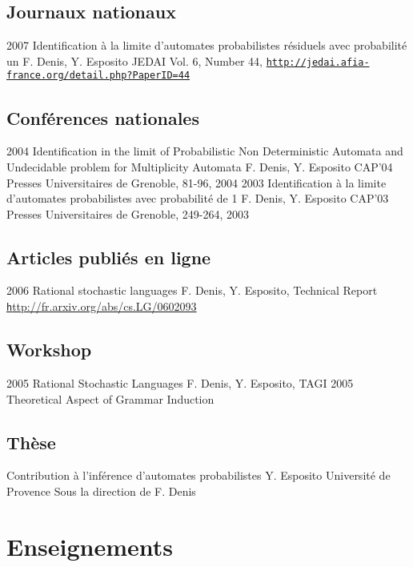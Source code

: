 \subsection*{Journaux nationaux}

\article
{2007}
{Identification à la limite d'automates probabilistes résiduels avec probabilité un}
{F. Denis, Y. Esposito}
{JEDAI}
{Vol. 6, Number 44, \href{http://jedai.afia-france.org/detail.php?PaperID=44}{\texttt{http://jedai.afia-france.org/detail.php?PaperID=44}}}

\subsection*{Conférences nationales}

\article
{2004}
{Identification in the limit of Probabilistic Non Deterministic Automata and Undecidable problem for Multiplicity Automata}
{F. Denis, Y. Esposito}
{CAP'04}
{Presses Universitaires de Grenoble, 81-96, 2004}
\article
{2003}
{Identification à la limite d'automates probabilistes avec probabilité de 1}
{F. Denis, Y. Esposito}
{CAP'03}
{Presses Universitaires de Grenoble, 249-264, 2003}

\subsection*{Articles publiés en ligne}

\article
{2006}
{Rational stochastic languages}
{ F. Denis, Y. Esposito,}
{Technical Report}
{\href{http://fr.arxiv.org/abs/cs.LG/0602093}{\texttt http://fr.arxiv.org/abs/cs.LG/0602093}}

\subsection*{Workshop}

\article
{2005}
{Rational Stochastic Languages}
{ F. Denis, Y. Esposito,}
{TAGI 2005}
{Theoretical Aspect of Grammar Induction}

\subsection*{Thèse}
{Contribution à l'inférence d'automates probabilistes}
{Y. Esposito}
{Université de Provence}
{Sous la direction de F. Denis}

\section*{Enseignements}

